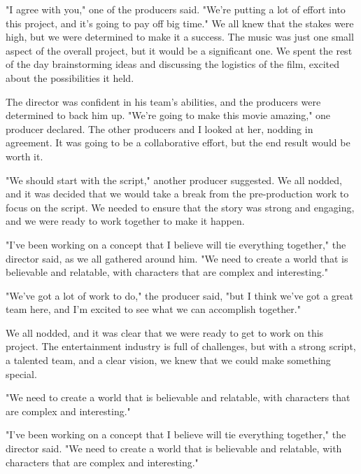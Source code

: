 \documentclass[smalldemyvopaper,11pt,twoside,onecolumn,openright,extrafontsizes]{memoir}
\begin{document}
"I agree with you," one of the producers said. "We're putting a lot of effort into this project, and it's going to pay off big time." We all knew that the stakes were high, but we were determined to make it a success. The music was just one small aspect of the overall project, but it would be a significant one. We spent the rest of the day brainstorming ideas and discussing the logistics of the film, excited about the possibilities it held.\par
The director was confident in his team's abilities, and the producers were determined to back him up. "We're going to make this movie amazing," one producer declared. The other producers and I looked at her, nodding in agreement. It was going to be a collaborative effort, but the end result would be worth it.\par
"We should start with the script," another producer suggested. We all nodded, and it was decided that we would take a break from the pre-production work to focus on the script. We needed to ensure that the story was strong and engaging, and we were ready to work together to make it happen.\par
"I've been working on a concept that I believe will tie everything together," the director said, as we all gathered around him. "We need to create a world that is believable and relatable, with characters that are complex and interesting."\par
"We've got a lot of work to do," the producer said, "but I think we've got a great team here, and I'm excited to see what we can accomplish together."\par
We all nodded, and it was clear that we were ready to get to work on this project. The entertainment industry is full of challenges, but with a strong script, a talented team, and a clear vision, we knew that we could make something special.\par
"We need to create a world that is believable and relatable, with characters that are complex and interesting."\par
"I've been working on a concept that I believe will tie everything together," the director said. "We need to create a world that is believable and relatable, with characters that are complex and interesting."\par

\end{document}
